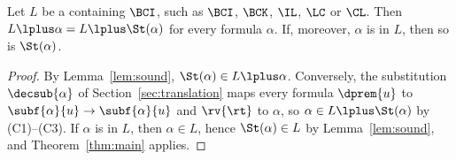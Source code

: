 \begin{corollary}\label{cor:many-logics}
Let $L$ be a  containing $\BCI$, such as $\BCI$, $\BCK$, $\IL$,
$\LC$ or $\CL$. Then $L\lplus\alpha=L\lplus\St(\alpha)$ for every formula
$\alpha$. If, moreover, $\alpha$ is  in $L$, then so is
$\St(\alpha)$.
\end{corollary}
\begin{proof}
By Lemma~\ref{lem:sound}, $\St(\alpha)\in L\lplus\alpha$. Conversely, the
substitution $\decsub{\alpha}$ of Section~\ref{sec:translation} maps every formula $\dprem{u}$ to
$\subf{\alpha}{u}\to\subf{\alpha}{u}$ and $\rv{\rt}$ to $\alpha$, so
$\alpha\in L\lplus\St(\alpha)$ by (C1)--(C3). If $\alpha$ is 
in $L$, then $\alpha\in L$, hence $\St(\alpha)\in L$ by
Lemma~\ref{lem:sound}, and Theorem~\ref{thm:main} applies.
\end{proof}
